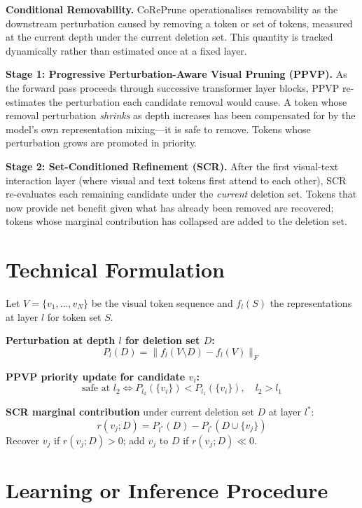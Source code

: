 \documentclass[10pt,twocolumn]{article}
\begin{document}
\textbf{Conditional Removability.} CoRePrune operationalises removability as
the downstream perturbation caused by removing a token or set of tokens,
measured at the current depth under the current deletion set. This quantity
is tracked dynamically rather than estimated once at a fixed layer.

\textbf{Stage 1: Progressive Perturbation-Aware Visual Pruning (PPVP).}
As the forward pass proceeds through successive transformer layer blocks,
PPVP re-estimates the perturbation each candidate removal would cause. A token
whose removal perturbation \emph{shrinks} as depth increases has been
compensated for by the model's own representation mixing---it is safe to remove.
Tokens whose perturbation grows are promoted in priority.

\textbf{Stage 2: Set-Conditioned Refinement (SCR).}
After the first visual-text interaction layer (where visual and text tokens
first attend to each other), SCR re-evaluates each remaining candidate under
the \emph{current} deletion set. Tokens that now provide net benefit given
what has already been removed are recovered; tokens whose marginal contribution
has collapsed are added to the deletion set.

\section{Technical Formulation}

Let $V = \{v_1, \ldots, v_N\}$ be the visual token sequence and
$f_l(S)$ the representations at layer $l$ for token set $S$.

\textbf{Perturbation at depth $l$ for deletion set $D$:}
\[
P_l(D) = \bigl\|f_l(V \setminus D) - f_l(V)\bigr\|_F
\]

\textbf{PPVP priority update for candidate $v_i$:}
\[
\text{safe at } l_2 \iff P_{l_2}(\{v_i\}) < P_{l_1}(\{v_i\}),
\quad l_2 > l_1
\]

\textbf{SCR marginal contribution} under current deletion set $D$ at layer $l^*$:
\[
r(v_j; D) = P_{l^*}(D) - P_{l^*}(D \cup \{v_j\})
\]
Recover $v_j$ if $r(v_j; D) > 0$;
add $v_j$ to $D$ if $r(v_j; D) \ll 0$.

\section{Learning or Inference Procedure}
\end{document}

